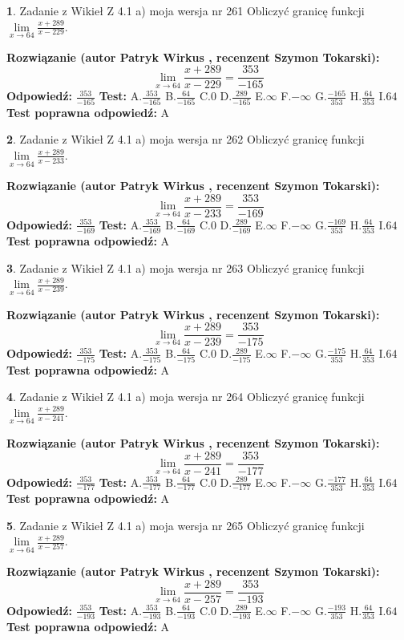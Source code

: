 \documentclass[12pt, a4paper]{article}
\theoremstyle{definition} %
\newtheorem{zad}{}
\newcommand{\zadStart}[1]{\begin{zad}#1\newline}
\newcommand{\zadStop}{\end{zad}}
\newcommand{\rozwStart}[2]{\noindent \textbf{Rozwiązanie (autor #1 , recenzent #2): }\newline}
\newcommand{\rozwStop}{\newline}
\newcommand{\odpStart}{\noindent \textbf{Odpowiedź:}\newline}
\newcommand{\odpStop}{\newline}
\newcommand{\testStart}{\noindent \textbf{Test:}\newline}
\newcommand{\testStop}{\newline}
\newcommand{\kluczStart}{\noindent \textbf{Test poprawna odpowiedź:}\newline}
\newcommand{\kluczStop}{\newline}
\begin{document}
\zadStart{Zadanie z Wikieł Z 4.1 a) moja wersja nr 261}
Obliczyć granicę funkcji $\lim\limits_{x\to64}\frac{x+289}{x-229}$.
\zadStop
\rozwStart{Patryk Wirkus}{Szymon Tokarski}
$$\lim\limits_{x\to64}\frac{x+289}{x-229} = \frac{353}{-165}$$
\rozwStop
\odpStart
$\frac{353}{-165}$
\odpStop
\testStart
A.$\frac{353}{-165}$
B.$\frac{64}{-165}$
C.$0$
D.$\frac{289}{-165}$
E.$\infty$
F.$-\infty$
G.$\frac{-165}{353}$
H.$\frac{64}{353}$
I.$64$
\testStop
\kluczStart
A
\kluczStop



\zadStart{Zadanie z Wikieł Z 4.1 a) moja wersja nr 262}
Obliczyć granicę funkcji $\lim\limits_{x\to64}\frac{x+289}{x-233}$.
\zadStop
\rozwStart{Patryk Wirkus}{Szymon Tokarski}
$$\lim\limits_{x\to64}\frac{x+289}{x-233} = \frac{353}{-169}$$
\rozwStop
\odpStart
$\frac{353}{-169}$
\odpStop
\testStart
A.$\frac{353}{-169}$
B.$\frac{64}{-169}$
C.$0$
D.$\frac{289}{-169}$
E.$\infty$
F.$-\infty$
G.$\frac{-169}{353}$
H.$\frac{64}{353}$
I.$64$
\testStop
\kluczStart
A
\kluczStop



\zadStart{Zadanie z Wikieł Z 4.1 a) moja wersja nr 263}
Obliczyć granicę funkcji $\lim\limits_{x\to64}\frac{x+289}{x-239}$.
\zadStop
\rozwStart{Patryk Wirkus}{Szymon Tokarski}
$$\lim\limits_{x\to64}\frac{x+289}{x-239} = \frac{353}{-175}$$
\rozwStop
\odpStart
$\frac{353}{-175}$
\odpStop
\testStart
A.$\frac{353}{-175}$
B.$\frac{64}{-175}$
C.$0$
D.$\frac{289}{-175}$
E.$\infty$
F.$-\infty$
G.$\frac{-175}{353}$
H.$\frac{64}{353}$
I.$64$
\testStop
\kluczStart
A
\kluczStop



\zadStart{Zadanie z Wikieł Z 4.1 a) moja wersja nr 264}
Obliczyć granicę funkcji $\lim\limits_{x\to64}\frac{x+289}{x-241}$.
\zadStop
\rozwStart{Patryk Wirkus}{Szymon Tokarski}
$$\lim\limits_{x\to64}\frac{x+289}{x-241} = \frac{353}{-177}$$
\rozwStop
\odpStart
$\frac{353}{-177}$
\odpStop
\testStart
A.$\frac{353}{-177}$
B.$\frac{64}{-177}$
C.$0$
D.$\frac{289}{-177}$
E.$\infty$
F.$-\infty$
G.$\frac{-177}{353}$
H.$\frac{64}{353}$
I.$64$
\testStop
\kluczStart
A
\kluczStop



\zadStart{Zadanie z Wikieł Z 4.1 a) moja wersja nr 265}
Obliczyć granicę funkcji $\lim\limits_{x\to64}\frac{x+289}{x-257}$.
\zadStop
\rozwStart{Patryk Wirkus}{Szymon Tokarski}
$$\lim\limits_{x\to64}\frac{x+289}{x-257} = \frac{353}{-193}$$
\rozwStop
\odpStart
$\frac{353}{-193}$
\odpStop
\testStart
A.$\frac{353}{-193}$
B.$\frac{64}{-193}$
C.$0$
D.$\frac{289}{-193}$
E.$\infty$
F.$-\infty$
G.$\frac{-193}{353}$
H.$\frac{64}{353}$
I.$64$
\testStop
\kluczStart
A
\kluczStop
\end{document}
